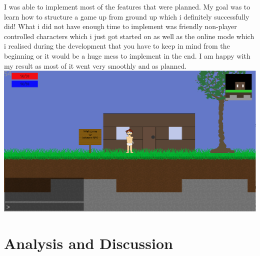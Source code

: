 \documentclass[a4paper,12pt]{article}
\begin{document}
I was able to implement most of the features that were planned.
My goal was to learn how to structure a game up from ground up which i definitely successfully did!
What i did not have enough time to implement was friendly non-player controlled characters which i just got started on as well as the online mode which i realised during the development that you have to keep in mind from the beginning or it would be a huge mess to implement in the end.
I am happy with my result as most of it went very smoothly and as planned.
\\
\hspace{-20pt}
\includegraphics[width=\textwidth]{img/screenshot1.eps}






\clearpage

\section{Analysis and Discussion}
\end{document}
